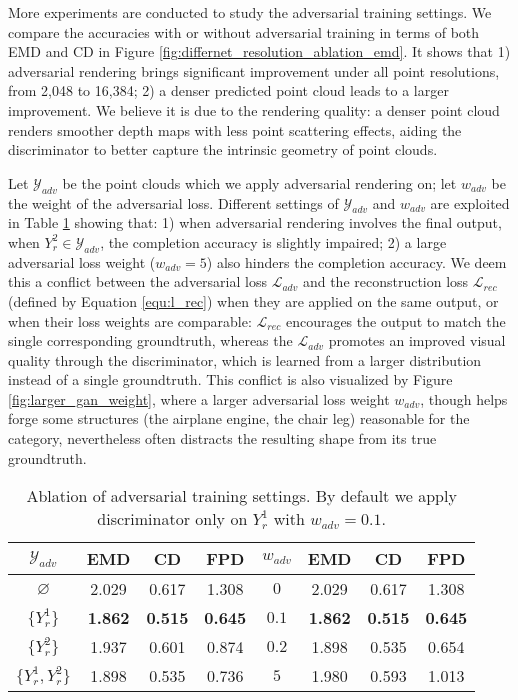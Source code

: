 \documentclass[final]{cvpr}
\begin{document}
More experiments are conducted to study the adversarial training settings. We compare the accuracies with or without adversarial training in terms of both EMD and CD in Figure \ref{fig:differnet_resolution_ablation_emd}. It shows that 1) adversarial rendering brings significant improvement under all point resolutions, from 2,048 to 16,384; 2) a denser predicted point cloud leads to a larger improvement. We believe it is due to the rendering quality: a denser point cloud renders smoother depth maps with less point scattering effects, aiding the discriminator to better capture the intrinsic geometry of point clouds.

Let $\mathcal{Y}_{adv}$ be the point clouds which we apply adversarial rendering on; let $w_{adv}$ be the weight of the adversarial loss. 
Different settings of $\mathcal{Y}_{adv}$ and $w_{adv}$ are exploited in Table \ref{table:ablation_gan} showing that:
1) when adversarial rendering involves the final output, \ie when $Y_r^2 \in \mathcal{Y}_{adv}$, the completion accuracy is slightly impaired; 2) a large adversarial loss weight ($w_{adv}=5$) also hinders the completion accuracy.
We deem this a conflict between the adversarial loss $\mathcal{L}_{adv}$ and the reconstruction loss $\mathcal{L}_{rec}$ (defined by Equation \ref{equ:l_rec}) when they are applied on the same output, or when their loss weights are comparable: 
$\mathcal{L}_{rec}$ encourages the output to match the single corresponding groundtruth, whereas the $\mathcal{L}_{adv}$ promotes an improved visual quality through the discriminator, which is learned from a larger distribution instead of a single groundtruth. This conflict is also visualized by Figure \ref{fig:larger_gan_weight}, where a larger adversarial loss weight $w_{adv}$, though helps forge some structures (\eg the airplane engine, the chair leg) reasonable for the category, nevertheless often distracts the resulting shape from its true groundtruth.


\begin{table}[t]
\begin{center}
\footnotesize
\setlength\tabcolsep{2.0pt}
\begin{tabular}{@{}c|ccc||c|ccc@{}}
\toprule
 $\mathcal{Y}_{adv}$  &  EMD & CD & FPD & $w_{adv}$ & EMD & CD & FPD \\
\midrule
$\varnothing$ & 2.029 & 0.617 & 1.308 & $0$ & 2.029 & 0.617 & 1.308 \\
$\{Y_r^1\}$ & \textbf{1.862} & \textbf{0.515} & \textbf{0.645} & $0.1$ & \textbf{1.862} & \textbf{0.515} & \textbf{0.645} \\
$\{Y_r^2\}$  & 1.937 & 0.601 & 0.874 & $0.2$ & 1.898 & 0.535 & 0.654\\
$\{Y_r^1, Y_r^2\}$ & 1.898 & 0.535 & 0.736 & $5$ & 1.980 & 0.593 & 1.013\\
\bottomrule
\end{tabular}
\end{center}
\caption{Ablation of adversarial training settings. By default we apply discriminator only on $Y_r^1$ with $w_{adv}=0.1$.}
\label{table:ablation_gan}
\vspace{-1em}
\end{table}
\end{document}
